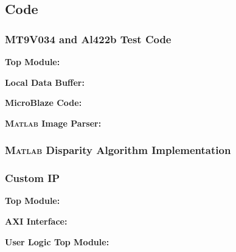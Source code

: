 \subsection{Code}

\subsubsection{MT9V034 and Al422b Test Code} \label{mt9v034TestCode}
\textbf{Top Module:}
\singlespacing

\doublespacing
\par
\textbf{Local Data Buffer:}
\singlespacing

\doublespacing
\par
\textbf{MicroBlaze Code:}
\label{camTestC}
\singlespacing

\doublespacing
\par
\textbf{\textsc{Matlab} Image Parser:}
\label{camTestMatlab}
\singlespacing

\doublespacing

\newpage

\subsubsection{\textsc{Matlab} Disparity Algorithm Implementation} \label{disparityTestMatlab}
\singlespacing

\doublespacing

\newpage

\subsubsection{Custom IP} 
\textbf{Top Module:} \label{customIPtop}
\singlespacing

\doublespacing

\par
\textbf{AXI Interface:} \label{customIPaxi}
\singlespacing

\doublespacing

\par
\textbf{User Logic Top Module:}
\singlespacing

\doublespacing

